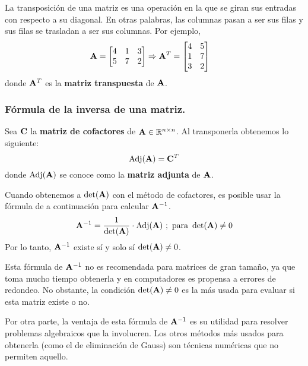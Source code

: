 \documentclass[12pt]{article}
\begin{document}
La transposición de una matriz es una operación en la que se giran sus entradas con respecto a su diagonal. En otras palabras, las columnas pasan a ser sus filas y sus filas se trasladan a ser sus columnas. Por ejemplo,
\begin{align*}
\mathbf{A} &=
\begin{bmatrix}
4 & 1 & 3 \\
5 & 7 & 2
\end{bmatrix}
\Rightarrow
\mathbf{A}^{T} =
\begin{bmatrix}
4 & 5 \\
1 & 7 \\
3 & 2
\end{bmatrix}
\end{align*}
donde $\mathbf{A}^{T}$ es la \textbf{matriz transpuesta} de $\mathbf{A}$.

\subsubsection{Fórmula de la inversa de una matriz.}

Sea $\mathbf{C}$ la \textbf{matriz de cofactores} de $\mathbf{A} \in \mathbb{R}^{n \times n}$. Al transponerla obtenemos lo siguiente:
\[
  \text{Adj}(\mathbf{A}) = \mathbf{C}^{T}
\]
donde $\text{Adj}(\mathbf{A})$ se conoce como la \textbf{matriz adjunta} de $\mathbf{A}$.

Cuando obtenemos a $\det(\mathbf{A})$ con el método de cofactores, es posible usar la fórmula de a continuación para calcular $\mathbf{A}^{-1}$.
\[
  \mathbf{A}^{-1} = \frac{1}{\det(\mathbf{A})} \cdot \text{Adj}(\mathbf{A}) \ ; \text{ para } \det(\mathbf{A}) \neq 0
\]
Por lo tanto, $\mathbf{A}^{-1}$ existe sí y solo sí $\det(\mathbf{A}) \neq 0$.

Esta fórmula de $\mathbf{A}^{-1}$ no es recomendada para matrices de gran tamaño, ya que toma mucho tiempo obtenerla y en computadores es propensa a errores de redondeo. No obstante, la condición $\det(\mathbf{A}) \neq 0$ es la más usada para evaluar si esta matriz existe o no.

Por otra parte, la ventaja de esta fórmula de $\mathbf{A}^{-1}$ es su utilidad para resolver problemas algebraicos que la involucren. Los otros métodos más usados para obtenerla (como el de eliminación de Gauss) son técnicas numéricas que no permiten aquello.
\end{document}

